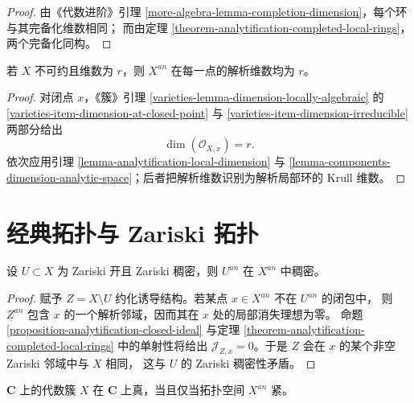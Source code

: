 \begin{proof}
由《代数进阶》引理 \ref{more-algebra-lemma-completion-dimension}，每个环与其完备化维数相同；
而由定理 \ref{theorem-analytification-completed-local-rings}，两个完备化同构。
\end{proof}

\begin{lemma}
\label{lemma-analytification-dimension}
若 $X$ 不可约且维数为 $r$，则 $X^{an}$ 在每一点的解析维数均为 $r$。
\end{lemma}

\begin{proof}
对闭点 $x$，《簇》引理 \ref{varieties-lemma-dimension-locally-algebraic} 的
\ref{varieties-item-dimension-at-closed-point} 与
\ref{varieties-item-dimension-irreducible} 两部分给出
$$
\dim(\mathcal O_{X,x})=r.
$$
依次应用引理 \ref{lemma-analytification-local-dimension} 与
\ref{lemma-components-dimension-analytic-space}；后者把解析维数识别为解析局部环的 Krull 维数。
\end{proof}

\section{经典拓扑与 Zariski 拓扑}
\label{section-classical-zariski-topologies}

\begin{lemma}
\label{lemma-zariski-dense-open-analytically-dense}
设 $U \subset X$ 为 Zariski 开且 Zariski 稠密，则 $U^{an}$ 在 $X^{an}$ 中稠密。
\end{lemma}

\begin{proof}
赋予 $Z=X\setminus U$ 约化诱导结构。若某点 $x \in X^{an}$ 不在 $U^{an}$ 的闭包中，
则 $Z^{an}$ 包含 $x$ 的一个解析邻域，因而其在 $x$ 处的局部消失理想为零。
命题 \ref{proposition-analytification-closed-ideal} 与定理
\ref{theorem-analytification-completed-local-rings} 中的单射性将给出
$\mathcal J_{Z,x}=0$。于是 $Z$ 会在 $x$ 的某个非空 Zariski 邻域中与 $X$ 相同，
这与 $U$ 的 Zariski 稠密性矛盾。
\end{proof}

\begin{proposition}
\label{proposition-proper-if-and-only-if-compact-analytification}
$\mathbf C$ 上的代数簇 $X$ 在 $\mathbf C$ 上真，当且仅当拓扑空间 $X^{an}$ 紧。
\end{proposition}

